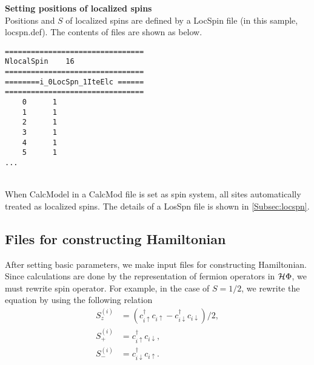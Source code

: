 \begin{description}
\item {\bf Setting positions of localized spins}\\
Positions {and $S$} of localized spins are defined by a LocSpin file (in this sample, locspn.def). The contents of files are shown as below.\\
\begin{minipage}{15cm}
\begin{screen}
\begin{verbatim}
================================ 
NlocalSpin    16  
================================ 
========i_0LocSpn_1IteElc ====== 
================================ 
    0      1
    1      1
    2      1
    3      1
    4      1
    5      1
...
\end{verbatim}
\end{screen}
\end{minipage}
~\\
When CalcModel in a CalcMod file is set as spin system, all sites automatically treated as localized spins. The details of a LosSpn file is shown in \ref{Subsec:locspn}.
\end{description}

\subsection{Files for constructing Hamiltonian}
After setting basic parameters, we make input files for constructing Hamiltonian. Since calculations are done by the representation of fermion operators in $\mathcal{H} \Phi$, we must rewrite spin operator. {For example,  in the case of $S=1/2$, we rewrite the equation by} using the following relation
\begin{align}
S_z^{(i)}&=(c_{i\uparrow}^{\dag}c_{i\uparrow}-c_{i\downarrow}^{\dag}c_{i\downarrow})/2,\\
S_+^{(i)}&=c_{i\uparrow}^{\dag}c_{i\downarrow},\\
S_-^{(i)}&=c_{i\downarrow}^{\dag}c_{i\uparrow}.
\end{align}

